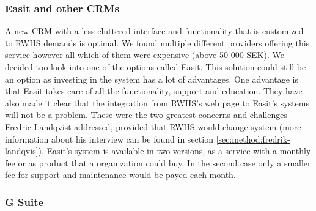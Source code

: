 
\subsubsection{Easit and other CRMs}
A new CRM with a less cluttered interface and functionality that is customized to RWHS demands is optimal. We found multiple different providers offering this service however all which of them were expensive (above 50 000 SEK). We decided too look into one of the options called Easit. This solution could still be an option as investing in the system has a lot of advantages. One advantage is that Easit takes care of all the functionality, support and education. They have also made it clear that the integration from RWHS's web page to Easit's systems will not be a problem. These were the two greatest concerns and challenges Fredric Landqvist addressed, provided that RWHS would change system (more information about his interview can be found in section \ref{sec:method:fredrik-landqvis}). Easit's system is available in two versions, as a service with a monthly fee or as product that a organization could buy. In the second case only a smaller fee for support and maintenance would be payed each month.



\subsubsection{G Suite}
\label{result:google-suite}


